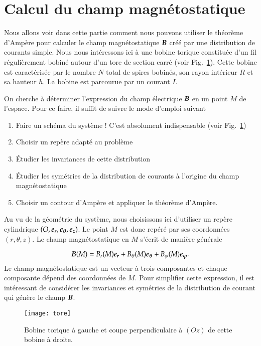 \section{Calcul du champ magnétostatique}
\label{sec:calcul_e}
Nous allons voir dans cette partie comment nous pouvons utiliser le théorème d'Ampère
pour calculer le champ magnétostatique $\vecb$ créé 
par une distribution de courants simple. Nous nous intéressons ici à une bobine
torique constituée d'un fil régulièrement bobiné autour d'un tore de section
carré (voir Fig.~\ref{fig:magneto_tore}). Cette bobine est caractérisée par le nombre $N$
total de spires bobinés, son rayon intérieur $R$ 
et sa hauteur $h$. La bobine est parcourue par un courant $I$.

On cherche à déterminer 
l'expression du champ électrique $\vecb$ en un point $M$ de l'espace. Pour ce faire, 
il suffit de suivre le mode d'emploi suivant
\begin{enumerate}
	\item Faire un schéma du système ! C'est absolument indispensable
	  (voir Fig.~\ref{fig:magneto_tore})
	\item Choisir un repère adapté au problème
	\item Étudier les invariances de cette distribution
	\item Étudier les symétries de la distribution de courants à l'origine 
	  du champ magnétostatique
	\item Choisir un contour d'Ampère et appliquer le théorème d'Ampère.
\end{enumerate}

Au vu de la géométrie du système, nous choisissons ici d'utiliser 
un repère cylindrique $(O, \er, \etheta, \ez)$.
Le point $M$ est donc repéré par ses coordonnées $(r, \theta, z)$. Le champ
magnétostatique en $M$ s'écrit de manière générale

\begin{equation}
	\vecb(M) = B_r(M)\er + B_\theta(M)\etheta + B_\varphi(M)\ephi.
	\label{eq:tore}
\end{equation}
Le champ magnétostatique est un vecteur à trois composantes et chaque composante
dépend des coordonnées de $M$. Pour simplifier cette expression, il est intéressant
de considérer les invariances et symétries de la distribution de courant qui génère
le champ $\vecb$.

\begin{figure}
	\centering
	\texttt{[image: tore]}
	\caption{Bobine torique à gauche et coupe perpendiculaire à $(Oz)$
	de cette bobine à droite.}%
	\label{fig:magneto_tore}
\end{figure}

